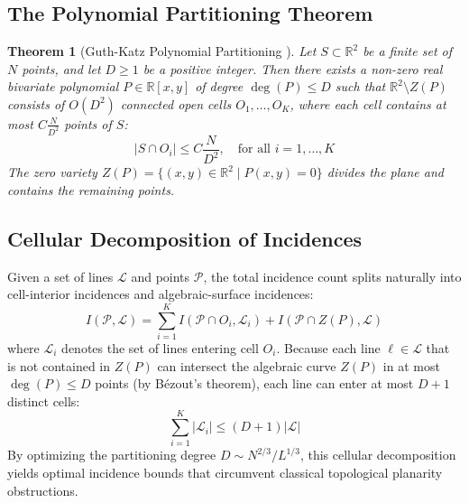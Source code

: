 \documentclass[11pt,a4paper]{article}
\newtheorem{theorem}{Theorem}[section]
\theoremstyle{definition}
\begin{document}
\subsection{The Polynomial Partitioning Theorem}
\begin{theorem}[Guth-Katz Polynomial Partitioning \cite{guthkatz2015}]\label{thm:gk_part}
Let $S \subset \mathbb{R}^2$ be a finite set of $N$ points, and let $D \ge 1$ be a positive integer. Then there exists a non-zero real bivariate polynomial $P \in \mathbb{R}[x, y]$ of degree $\deg(P) \le D$ such that $\mathbb{R}^2 \setminus Z(P)$ consists of $O(D^2)$ connected open cells $O_1, \dots, O_K$, where each cell contains at most $C \frac{N}{D^2}$ points of $S$:
\begin{equation}
|S \cap O_i| \le C \frac{N}{D^2}, \quad \text{for all } i = 1, \dots, K
\end{equation}
The zero variety $Z(P) = \{(x, y) \in \mathbb{R}^2 \mid P(x, y) = 0\}$ divides the plane and contains the remaining points.
\end{theorem}

\subsection{Cellular Decomposition of Incidences}
Given a set of lines $\mathcal{L}$ and points $\mathcal{P}$, the total incidence count splits naturally into cell-interior incidences and algebraic-surface incidences:
\begin{equation}
I(\mathcal{P}, \mathcal{L}) = \sum_{i=1}^K I(\mathcal{P} \cap O_i, \mathcal{L}_i) + I(\mathcal{P} \cap Z(P), \mathcal{L})
\end{equation}
where $\mathcal{L}_i$ denotes the set of lines entering cell $O_i$.
Because each line $\ell \in \mathcal{L}$ that is not contained in $Z(P)$ can intersect the algebraic curve $Z(P)$ in at most $\deg(P) \le D$ points (by B\'ezout's theorem), each line can enter at most $D + 1$ distinct cells:
\begin{equation}
\sum_{i=1}^K |\mathcal{L}_i| \le (D + 1) |\mathcal{L}|
\end{equation}
By optimizing the partitioning degree $D \sim N^{2/3} / L^{1/3}$, this cellular decomposition yields optimal incidence bounds that circumvent classical topological planarity obstructions.
\end{document}
